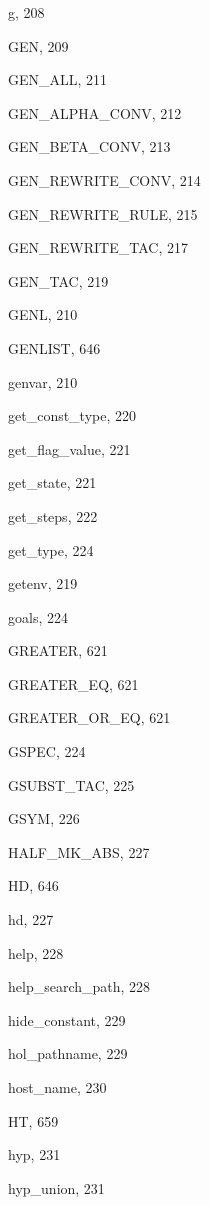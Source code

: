 \begin{theindex}
  \indexspace

  \item {\ptt g}, 208
  \item {\ptt GEN}, 209
  \item {\ptt GEN\_ALL}, 211
  \item {\ptt GEN\_ALPHA\_CONV}, 212
  \item {\ptt GEN\_BETA\_CONV}, 213
  \item {\ptt GEN\_REWRITE\_CONV}, 214
  \item {\ptt GEN\_REWRITE\_RULE}, 215
  \item {\ptt GEN\_REWRITE\_TAC}, 217
  \item {\ptt GEN\_TAC}, 219
  \item {\ptt GENL}, 210
  \item {\ptt GENLIST}, 646
  \item {\ptt genvar}, 210
  \item {\ptt get\_const\_type}, 220
  \item {\ptt get\_flag\_value}, 221
  \item {\ptt get\_state}, 221
  \item {\ptt get\_steps}, 222
  \item {\ptt get\_type}, 224
  \item {\ptt getenv}, 219
  \item {\ptt goals}, 224
  \item {\ptt GREATER}, 621
  \item {\ptt GREATER\_EQ}, 621
  \item {\ptt GREATER\_OR\_EQ}, 621
  \item {\ptt GSPEC}, 224
  \item {\ptt GSUBST\_TAC}, 225
  \item {\ptt GSYM}, 226

  \indexspace

  \item {\ptt HALF\_MK\_ABS}, 227
  \item {\ptt HD}, 646
  \item {\ptt hd}, 227
  \item {\ptt help}, 228
  \item {\ptt help\_search\_path}, 228
  \item {\ptt hide\_constant}, 229
  \item {\ptt hol\_pathname}, 229
  \item {\ptt host\_name}, 230
  \item {\ptt HT}, 659
  \item {\ptt hyp}, 231
  \item {\ptt hyp\_union}, 231


\end{theindex}

